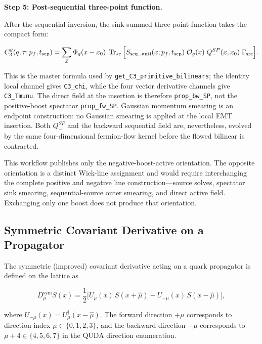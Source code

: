 \documentclass[11pt,a4paper]{article}
\newcommand{\code}[1]{\texttt{#1}}
\begin{document}
\textbf{Step 5: Post-sequential three-point function.}

After the sequential inversion, the sink-summed three-point function takes the compact form:

\begin{equation}\label{eq:C3_post_seq}
  C_3^g(q, \tau; p_f, t_{\text{sep}})
    = \sum_{\vec{x}} \Phi_q(x - x_0)\;
      \Tr_{sc}\Big[
        S_{\text{seq\_anti}}(x; p_f, t_{\text{sep}})\;
        \mathcal{O}_g(x)\;
        Q_-^{SP}(x, x_0)\;
        \Gamma_{\text{src}}
      \Big].
\end{equation}

This is the master formula used by \code{get\_C3\_primitive\_bilinears}; the
identity local channel gives \code{C3\_chi}, while the four vector derivative
channels give \code{C3\_Tmunu}.
The direct field at the insertion is therefore \code{prop\_bw\_SP}, not the
positive-boost spectator \code{prop\_fw\_SP}.  Gaussian momentum smearing is
an endpoint construction: no Gaussian smearing is applied at the local EMT
insertion.  Both \(Q_-^{SP}\) and the backward sequential field are,
nevertheless, evolved by the same four-dimensional fermion-flow kernel before
the flowed bilinear is contracted.

This workflow publishes only the negative-boost-active orientation.  The
opposite orientation is a distinct Wick-line assignment and would require
interchanging the complete positive and negative line construction---source
solves, spectator sink smearing, sequential-source outer smearing, and direct
active field.  Exchanging only one boost does not produce that orientation.


\subsection{Symmetric Covariant Derivative on a Propagator}
\label{sec:covdev_sym}

The symmetric (improved) covariant derivative acting on a quark propagator is defined on the lattice as

\begin{equation}\label{eq:D_sym}
  D_\mu^{\text{sym}} S(x)
    = \frac{1}{2}\Big[
        U_\mu(x)\, S(x + \hat{\mu})
        - U_{-\mu}(x)\, S(x - \hat{\mu})
      \Big],
\end{equation}

where $U_{-\mu}(x) = U_\mu^\dagger(x - \hat{\mu})$. The forward direction $+\mu$ corresponds to direction index $\mu \in \{0,1,2,3\}$, and the backward direction $-\mu$ corresponds to $\mu+4 \in \{4,5,6,7\}$ in the QUDA direction enumeration.
\end{document}
